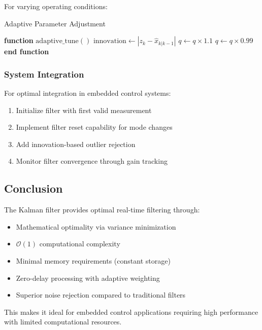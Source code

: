 \documentclass{article}
\begin{document}
For varying operating conditions:
\begin{algorithm}
\caption{Adaptive Parameter Adjustment}
\label{alg:adaptive_tuning}
\begin{algorithmic}[1]
\STATE \textbf{function} $\text{adaptive\_tune}()$
\STATE $\text{innovation} \leftarrow |z_k - \hat{x}_{k|k-1}|$
 
    \STATE $q \leftarrow q \times 1.1$ 
 
    \STATE $q \leftarrow q \times 0.99$ 
\ENDIF
\STATE \textbf{end function}
\end{algorithmic}
\end{algorithm}

\subsubsection{System Integration}

For optimal integration in embedded control systems:
\begin{enumerate}
    \item Initialize filter with first valid measurement
    \item Implement filter reset capability for mode changes
    \item Add innovation-based outlier rejection
    \item Monitor filter convergence through gain tracking
\end{enumerate}

\subsection{Conclusion}

The Kalman filter provides optimal real-time filtering through:
\begin{itemize}
    \item Mathematical optimality via variance minimization
    \item $\mathcal{O}(1)$ computational complexity
    \item Minimal memory requirements (constant storage)
    \item Zero-delay processing with adaptive weighting
    \item Superior noise rejection compared to traditional filters
\end{itemize}

This makes it ideal for embedded control applications requiring high performance with limited computational resources.
\end{document}
